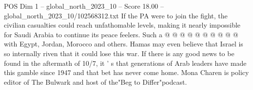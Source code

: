 \begin{textsample}{POS Dim 1 – global\_north\_2023\_10 – Score 18.00 – global\_north\_2023\_10/102568312.txt}
If the PA were to join the fight, the civilian casualties could reach unfathomable levels, making it nearly impossible for Saudi Arabia to continue its peace feelers.
Such a @ @ @ @ @ @ @ @ @ @ with Egypt, Jordan, Morocco and others.
Hamas may even believe that Israel is so internally riven that it could lose this war.
If there is any good news to be found in the aftermath of 10/7, it ' s that generations of Arab leaders have made this gamble since 1947 and that bet has never come home.
Mona Charen is policy editor of The Bulwark and host of the"Beg to Differ"podcast.

\end{textsample}
